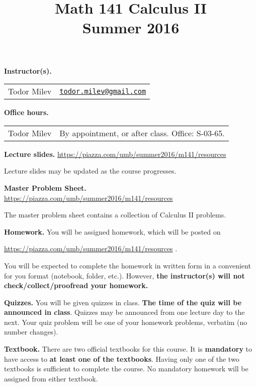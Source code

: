 \documentclass{article}
\title{Math 141 Calculus II \\ Summer 2016}
\date{}
\newcommand{\websitebase}{https://piazza.com/umb/summer2016/m141}
\begin{document}
\maketitle

\noindent \textbf{Instructor(s).} 
\begin{tabular}{ll}
Todor Milev & \href{mailto:todor.milev@gmail.com}{\nolinkurl{todor.milev@gmail.com}} 
\end{tabular}

\medskip
\noindent \textbf{Office hours. } \begin{tabular}{lp{12cm}}
Todor Milev & By appointment, or after class. Office: S-03-65.\\
\end{tabular}





\medskip \noindent \textbf{Lecture slides. }  \url{\websitebase/resources}

\medskip\noindent Lecture slides may be updated as the course progresses.


\medskip \noindent \textbf{Master Problem Sheet. }  \url{\websitebase/resources} 

\medskip\noindent The master problem sheet contains a collection of Calculus II problems. 

\medskip
\noindent \textbf{Homework.} You will be assigned homework, which will be posted on

\url{\websitebase/resources} \quad \quad \quad .

\noindent You will be expected to complete the homework in written form in a convenient for you format (notebook, folder, etc.). However, \textbf{the instructor(s) will not check/collect/proofread your homework.} 
 
\medskip
\noindent \textbf{Quizzes.} You will be given quizzes in class. \textbf{The time of the quiz will be announced in class}. Quizzes may be announced from one lecture day to the next. Your quiz problem will be one of your homework problems, verbatim (no number changes).

\medskip\noindent \textbf{Textbook. } There are two official textbooks for this course. It is  \textbf{mandatory} to have access to \textbf{at least one of the textbooks}. Having only one of the two textbooks is sufficient to complete the course. No mandatory homework will be assigned from either textbook. 
\end{document}
